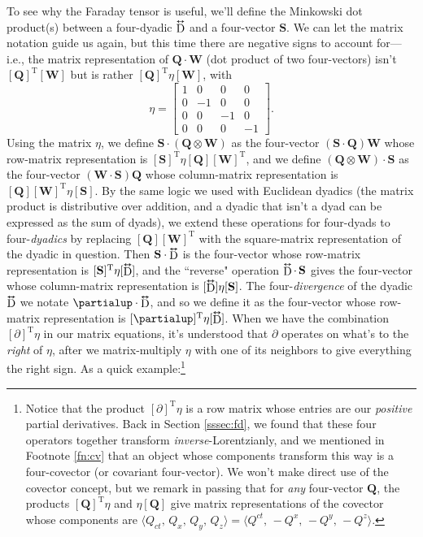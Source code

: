 \documentclass[12pt]{article}
\renewcommand{\vv}[1]{\mathbf{#1}}
\newcommand{\tightoverset}[2]{%
  \mathop{#2}\limits^{\vbox to -.5ex{\kern-0.75ex\hbox{$#1$}\vss}}}
\newcommand{\inlinedy}[1]{\tightoverset{\text{\tiny$\bm\leftrightarrow$}}{#1}}
\begin{document}
To see why the Faraday tensor is useful, we'll define the Minkowski dot product(s) between a four-dyadic $\inlinedy{\mathrm{D}}$ and a four-vector $\vv S$. We can let the matrix notation guide us again, but this time there are negative signs to account for---i.e., the matrix representation of $\vv Q \cdot \vv W$ (dot product of two four-vectors) isn't $[\vv Q]^{\textrm{T}} [\vv W]$ but is rather $[\vv Q]^{\textrm{T}} \eta [\vv W]$, with
\begin{equation}\label{eq:mmt}
\eta
=
\begin{bmatrix}
1 & 0 & 0 & 0 \\
0 & -1 & 0 & 0 \\
0 & 0 & -1 & 0 \\
0 & 0 & 0 & -1
\end{bmatrix} .
\end{equation}
Using the matrix $\eta$, we define $\vv S \cdot (\vv Q \otimes \vv W)$ as the four-vector $(\vv S \cdot \vv Q) \vv W$ whose row-matrix representation is $[\vv S]^\mathrm{T} \eta [\vv Q] [\vv W]^\mathrm{T}$, and we define $(\vv Q \otimes \vv W) \cdot \vv S$ as the four-vector $(\vv W \cdot \vv S) \vv Q$ whose column-matrix representation is $[\vv Q] [\vv W]^\mathrm{T} \eta [\vv S]$. By the same logic we used with Euclidean dyadics (the matrix product is distributive over addition, and a dyadic that isn't a dyad can be expressed as the sum of dyads), we extend these operations for four-dyads to four-\emph{dyadics} by replacing $[\vv Q][\vv W]^{\textrm{T}}$ with the square-matrix representation of the dyadic in question. Then $\vv S \cdot \inlinedy{\mathrm{D}}$ is the four-vector whose row-matrix representation is $[\vv S]^{\mathrm{T}} \eta [\inlinedy{\mathrm{D}}]$, and the ``reverse" operation $\inlinedy{\mathrm{D}} \cdot \, \vv S$ gives the four-vector whose column-matrix representation is $[\inlinedy{\mathrm{D}}] \eta [\vv S]$. The four-\emph{divergence} of the dyadic $\inlinedy{\mathrm{D}}$ we notate $\partialup \cdot \inlinedy{\mathrm{D}}$, and so we define it as the four-vector whose row-matrix representation is $[\partialup]^{\mathrm{T}} \eta [\inlinedy{\mathrm{D}}]$. When we have the combination $[\partialup]^\mathrm{T} \eta$ in our matrix equations, it's understood that $\partialup$ operates on what's to the \emph{right} of $\eta$, after we matrix-multiply $\eta$ with one of its neighbors to give everything the right sign. As a quick example:\footnote{Notice that the product $[\partialup]^\mathrm{T} \eta$ is a row matrix whose entries are our \emph{positive} partial derivatives. Back in Section \ref{sssec:fd}, we found that these four operators together transform \emph{inverse}-Lorentzianly, and we mentioned in Footnote \ref{fn:cv} that an object whose components transform this way is a four-covector (or covariant four-vector). We won't make direct use of the covector concept, but we remark in passing that for \emph{any} four-vector $\vv Q$, the products $[\vv Q]^\mathrm{T} \eta$ and $\eta [\vv Q]$ give matrix representations of the covector whose components are $\langle Q_{ct}, \, Q_x, \, Q_y, \, Q_z \rangle = \langle Q^{ct}, \, -Q^x, \, -Q^y, \, -Q^z \rangle$.}
\end{document}

